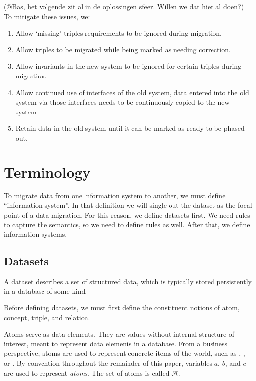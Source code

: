 \documentclass{elsarticle}
\begin{document}
(@Bas, het volgende zit al in de oplossingen sfeer. Willen we dat hier al doen?)
	To mitigate these issues, we:
	
	\begin{enumerate}
	\item Allow `missing' triples requirements to be ignored during migration.
	\item Allow triples to be migrated while being marked as needing correction.
	\item Allow invariants in the new system to be ignored for certain triples during migration.
	\item Allow continued use of interfaces of the old system, data entered into the old system via those interfaces needs to be continuously copied to the new system.
	\item Retain data in the old system until it can be marked as ready to be phased out.
	\end{enumerate}	

\section{Terminology}
\label{sct:Terminology}
	To migrate data from one information system to another,
	we must define ``information system''.
	In that definition we will single out the dataset as the focal point of a data migration.
	For this reason, we define datasets first.
	We need rules to capture the semantics, so we need to define rules as well.
	After that, we define information systems.

\subsection{Datasets}
\label{sct:Datasets}
	A dataset describes a set of structured data, which is typically stored persistently in a database of some kind.

	Before defining datasets, we must first define the constituent notions of atom, concept, triple, and relation.
	
	Atoms serve as data elements.
	They are values without internal structure of interest, meant to represent data elements in a database.
	From a business perspective, atoms are used to represent concrete items of the world,
	such as , , or .
	By convention throughout the remainder of this paper, variables $a$, $b$, and $c$ are used to represent \emph{atoms}.
	The set of atoms is called $\mathcal{A}$.
	
\end{document}
